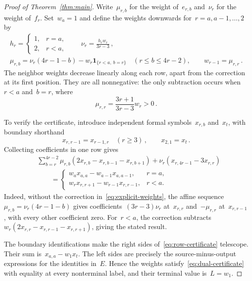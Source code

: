 \documentclass[11pt,letterpaper]{article}
\theoremstyle{definition}
\numberwithin{equation}{section}
\begin{document}
\begin{proof}[Proof of Theorem~\ref{thm:main}]
Write~$\mu_{r,b}$ for the weight of~$e_{r,b}$ and~$\nu_r$ for the weight of~$f_r$. Set~$w_a=1$ and define the weights downwards for~$r=a,a-1,\ldots,2$ by
\begin{equation}\label{eq:explicit-weights}
 \begin{gathered}
 h_r=\begin{cases}1,&r=a,\\2,&r<a,\end{cases}
 \qquad \nu_r=\frac{h_rw_r}{3r-3}\,,\\
 \mu_{r,b}=\nu_r(4r-1-b)-w_r\mathbf1_{\{r<a,\ b=r\}}
 \quad(r\leq b\leq4r-2),\qquad
 w_{r-1}=\mu_{r,r}\,.
 \end{gathered}
\end{equation}
The neighbor weights decrease linearly along each row, apart from the correction at its first position. They are all nonnegative: the only subtraction occurs when~$r<a$ and~$b=r$, where
\begin{equation*}
 \mu_{r,r}=\frac{3r+1}{3r-3}w_r>0\,.
\end{equation*}

To verify the certificate, introduce independent formal symbols~$x_{r,b}$ and~$x_t$, with boundary shorthand
\begin{equation*}
 x_{r,r-1}=x_{r-1,r}\quad(r\geq3)\,,\qquad x_{2,1}=x_t\,.
\end{equation*}
Collecting coefficients in one row gives
\begin{equation}\label{eq:row-certificate}
 \begin{aligned}
 &\sum_{b=r}^{4r-2}\mu_{r,b}
 (2x_{r,b}-x_{r,b-1}-x_{r,b+1})
 +\nu_r(x_{r,4r-1}-3x_{r,r})\\
 &\qquad=\begin{cases}
 w_a x_{a,a}-w_{a-1}x_{a,a-1},&r=a,\\
 w_r x_{r,r+1}-w_{r-1}x_{r,r-1},&r<a.
 \end{cases}
 \end{aligned}
\end{equation}
Indeed, without the correction in~\eqref{eq:explicit-weights}, the affine sequence~$\mu_{r,b}=\nu_r(4r-1-b)$ gives coefficients~$(3r-3)\nu_r$ at~$x_{r,r}$ and~$-\mu_{r,r}$ at~$x_{r,r-1}$, with every other coefficient zero. For~$r<a$, the correction subtracts~$w_r(2x_{r,r}-x_{r,r-1}-x_{r,r+1})$, giving the stated result.

The boundary identifications make the right sides of~\eqref{eq:row-certificate} telescope. Their sum is~$x_{a,a}-w_1x_t$. The left sides are precisely the source-minus-output expressions for the identities in~$E$. Hence the weights satisfy~\eqref{eq:dual-certificate} with equality at every nonterminal label, and their terminal value is~$L=w_1$.


\end{proof}
\end{document}
